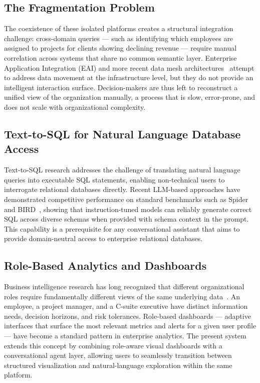 \subsection{The Fragmentation Problem}

The coexistence of these isolated platforms creates a structural integration
challenge: cross-domain queries — such as identifying which employees are
assigned to projects for clients showing declining revenue — require manual
correlation across systems that share no common semantic layer.
Enterprise Application Integration (EAI) and more recent data mesh
architectures~\cite{dehghani2022datamesh} attempt to address data movement
at the infrastructure level, but they do not provide an intelligent
interaction surface. Decision-makers are thus left to reconstruct a unified
view of the organization manually, a process that is slow, error-prone, and
does not scale with organizational complexity.

\subsection{Text-to-SQL for Natural Language Database Access}

Text-to-SQL research addresses the challenge of translating natural language
queries into executable SQL statements, enabling non-technical users to
interrogate relational databases directly. Recent LLM-based approaches have
demonstrated competitive performance on standard benchmarks such as
Spider~\cite{yu2018spider} and BIRD~\cite{li2023bird}, showing that
instruction-tuned models can reliably generate correct SQL across diverse
schemas when provided with schema context in the prompt. This capability is
a prerequisite for any conversational assistant that aims to provide
domain-neutral access to enterprise relational databases.

\subsection{Role-Based Analytics and Dashboards}

Business intelligence research has long recognized that different
organizational roles require fundamentally different views of the same
underlying data~\cite{watson2017bi}. An employee, a project manager, and a
C-suite executive have distinct information needs, decision horizons, and
risk tolerances. Role-based dashboards — adaptive interfaces that surface
the most relevant metrics and alerts for a given user profile — have become
a standard pattern in enterprise analytics. The present system extends this
concept by combining role-aware visual dashboards with a conversational
agent layer, allowing users to seamlessly transition between structured
visualization and natural-language exploration within the same platform.

